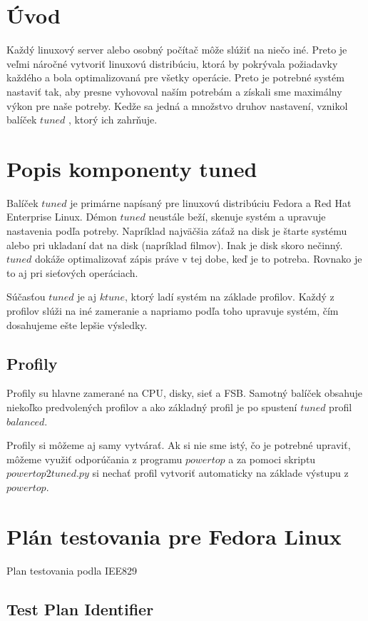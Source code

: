 \chapter{Úvod}
Každý linuxový server alebo osobný počítač môže slúžiť na niečo iné. Preto je
veľmi náročné vytvoriť linuxovú distribúciu, ktorá by pokrývala požiadavky
každého a bola optimalizovaná pre všetky operácie. Preto je potrebné systém
nastaviť tak, aby presne vyhovoval naším potrebám a získali sme maximálny výkon
pre naše potreby. Kedže sa jedná a množstvo druhov nastavení, vznikol balíček
$tuned$ \cite{tunedHomepage}, ktorý ich zahrňuje.

\chapter{Popis komponenty tuned}
Balíček $tuned$ je primárne napísaný pre linuxovú distribúciu Fedora a Red Hat
Enterprise Linux. Démon $tuned$ neustále beží, skenuje systém a upravuje
nastavenia podľa potreby. Napríklad najväčšia záťaž na disk je štarte systému
alebo pri ukladaní dat na disk (napríklad filmov). Inak je disk skoro nečinný.
$tuned$ dokáže optimalizovať zápis práve v tej dobe, keď je to potreba. Rovnako
je to aj pri sieťových operáciach.

Súčasťou $tuned$ je aj $ktune$, ktorý ladí systém na základe profilov. Každý z
profilov slúži na iné zameranie a napriamo podľa toho upravuje systém, čím
dosahujeme ešte lepšie výsledky.

\section{Profily}
Profily su hlavne zamerané na CPU, disky, sieť a FSB. Samotný balíček obsahuje
niekoľko predvolených profilov a ako základný profil je po spustení $tuned$
profil $balanced$.

Profily si môžeme aj samy vytvárať. Ak si nie sme istý, čo je potrebné upraviť,
môžeme využiť odporúčania z programu $powertop$ \cite{powertopHomepage} a za
pomoci skriptu $powertop2tuned.py$ si nechať profil vytvoriť automaticky na
základe výstupu z $powertop$. 

\chapter{Plán testovania pre Fedora Linux}
Plan testovania podla IEE829

\section{Test Plan Identifier}
